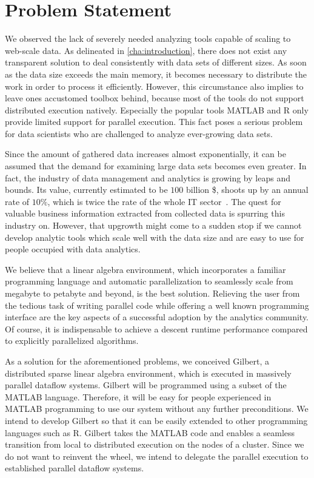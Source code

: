 \chapter{Problem Statement}
\label{cha:problemstatement}


We observed the lack of severely needed analyzing tools capable of scaling to web-scale data.
As delineated in \cref{cha:introduction}, there does not exist any transparent solution to deal consistently with data sets of different sizes.
As soon as the data size exceeds the main memory, it becomes necessary to distribute the work in order to process it efficiently.
However, this circumstance also implies to leave ones accustomed toolbox behind, because most of the tools do not support distributed execution natively.
Especially the popular tools MATLAB and R only provide limited support for parallel execution.
This fact poses a serious problem for data scientists who are challenged to analyze ever-growing data sets.

Since the amount of gathered data increases almost exponentially, it can be assumed that the demand for examining large data sets becomes even greater.
In fact, the industry of data management and analytics is growing by leaps and bounds.
Its value, currently estimated to be $100$ billion \$, shoots up by an annual rate of $10\%$, which is twice the rate of the whole IT sector~\cite{economist}.
The quest for valuable business information extracted from collected data is spurring this industry on.
However, that upgrowth might come to a sudden stop if we cannot develop analytic tools which scale well with the data size and are easy to use for people occupied with data analytics.

We believe that a linear algebra environment, which incorporates a familiar programming language and automatic parallelization to seamlessly scale from megabyte to petabyte and beyond, is the best solution.
Relieving the user from the tedious task of writing parallel code while offering a well known programming interface are the key aspects of a successful adoption by the analytics community.
Of course, it is indispensable to achieve a descent runtime performance compared to explicitly parallelized algorithms.

As a solution for the aforementioned problems, we conceived Gilbert, a distributed sparse linear algebra environment, which is executed in massively parallel dataflow systems.
Gilbert will be programmed using a subset of the MATLAB language.
Therefore, it will be easy for people experienced in MATLAB programming to use our system without any further preconditions.
We intend to develop Gilbert so that it can be easily extended to other programming languages such as R.
Gilbert takes the MATLAB code and enables a seamless transition from local to distributed execution on the nodes of a cluster.
Since we do not want to reinvent the wheel, we intend to delegate the parallel execution to established parallel dataflow systems.

